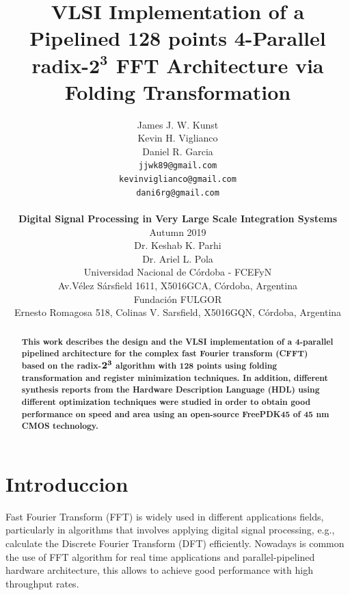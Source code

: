 \documentclass[journal,comsoc]{IEEEtran}
\begin{document}
\title{
\huge \bf VLSI Implementation of a Pipelined 128 points 4-Parallel radix-$\mathbf{2^3}$ FFT Architecture via Folding Transformation\\
}
\author{
\begin{minipage}{0.4\linewidth}
	\raggedleft
	James J. W. Kunst\\
	Kevin H. Viglianco\\
	Daniel R. Garcia
\end{minipage}
\begin{minipage}{0.4\linewidth}
	\raggedright	
	{\tt\small jjwk89@gmail.com}\\
	{\tt\small kevinviglianco@gmail.com}\\	
	{\tt\small dani6rg@gmail.com}			
\end{minipage}			
\\		
[0.5cm]
{\large \bf Digital Signal Processing in Very Large Scale Integration Systems}\\
[0.5cm]
Autumn 2019\\
[0.5cm]
Dr. Keshab K. Parhi	\\
Dr. Ariel L. Pola	\\
[0.5cm]
Universidad Nacional de Córdoba - FCEFyN\\
Av.Vélez Sársfield 1611, X5016GCA, C\'ordoba, Argentina\\
[0.5cm]
Fundación FULGOR\\
Ernesto Romagosa 518, Colinas V. Sarsfield, X5016GQN, Córdoba, Argentina%
}
\maketitle



\begin{abstract}
\bf This work describes the design and the VLSI implementation of a 4-parallel pipelined architecture for the complex fast Fourier transform (CFFT) based on the radix-$\bf 2^3$ algorithm with 128 points using folding transformation and register minimization techniques. In addition, different synthesis reports from the Hardware Description Language (HDL) using different optimization techniques were studied in order to obtain good performance on speed and area using an open-source FreePDK45 of 45 nm CMOS technology.
\end{abstract}



\section{Introduccion}
 Fast Fourier Transform (FFT) is widely used in different applications fields, particularly in algorithms that involves applying digital signal processing, e.g., calculate the Discrete Fourier Transform (DFT) efficiently. Nowadays is common the use of FFT algorithm for real time applications and parallel-pipelined hardware architecture, this allows to achieve good performance with high throughput rates.
\end{document}
